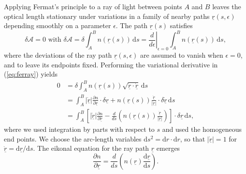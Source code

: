 \documentclass{article}
\begin{document}
Applying Fermat's principle to a ray of light between points $A$ and $B$ leaves the optical length stationary under variations in a family of nearby paths $\underline{r}(s,\epsilon)$ depending smoothly on a parameter $\epsilon$. The path $\underline{r}(s)$ satisfies
\begin{equation}
	\label{eq:ferray}
	\delta \mathcal{A} = 0 \mbox{ with } \delta \mathcal{A} = \delta \int_A^B \! n(\underline{r}(s)) \, \mathrm{d}s = \left.\frac{d}{d \epsilon}\right|_{\epsilon=0} \int_A^B \! n(\underline{r}(s)) \, \mathrm{d}s,
\end{equation}
where the deviations of the ray path $\underline{r}(s,\epsilon)$ are assumed to vanish when $\epsilon=0$, and to leave its endpoints fixed. Performing the variational derivative in (\ref{eq:ferray}) yields
\begin{equation}
	\begin{aligned}
		0 &= \delta \int_A^B \! n(\underline{r}(s)) \sqrt{\dot{\underline{r}} \cdot \dot{\underline{r}}} \, \mathrm{d}s \\
		&= \int_A^B \! \left|\dot{\underline{r}}\right| \frac{\partial n}{\partial \underline{r}} \cdot \delta\underline{r} + n(\underline{r}(s)) \frac{\dot{\underline{r}}}{\left|\dot{\underline{r}}\right|} \cdot \delta \dot{ \underline{r}} \, \mathrm{d}s \\
		&= \int_A^B \!  \left[ \left|\dot{\underline{r}}\right| \frac{\partial n}{\partial \underline{r}} - \frac{d}{ds} \left(n(\underline{r}(s)) \frac{\dot{\underline{r}}}{\left|\dot{\underline{r}}\right|}\right) \right] \cdot \delta \underline{r} \, \mathrm{d}s,
	\end{aligned}
\end{equation}
where we used integration by parts with respect to $s$ and used the homogeneous end points. We choose the arc-length variables $\mathrm{d}s^2 = \mathrm{d}r\cdot\mathrm{d}r$, so that $|\dot{\underline{r}}|=1$ for $\dot{\underline{r}} = \mathrm{d}\underline{r}/\mathrm{d}s$. The eikonal equation for the ray path $\underline{r}$ emerges
\begin{equation}
	\label{eq:axialrayequation}
	\frac{\partial n}{\partial \underline{r}} = \frac{d}{ds} \left(n(\underline{r}) \frac{\mathrm{d}\underline{r}}{\mathrm{d} s} \right).
\end{equation}
\end{document}
